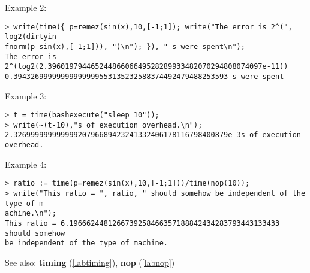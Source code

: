 \noindent Example 2: 
\begin{center}\begin{minipage}{15cm}\begin{Verbatim}[frame=single]
> write(time({ p=remez(sin(x),10,[-1;1]); write("The error is 2^(", log2(dirtyin
fnorm(p-sin(x),[-1;1])), ")\n"); }), " s were spent\n");
The error is 2^(log2(2.39601979446524486606649528289933482070294808074097e-11))
0.39432699999999999999553135232588374492479488253593 s were spent
\end{Verbatim}
\end{minipage}\end{center}
\noindent Example 3: 
\begin{center}\begin{minipage}{15cm}\begin{Verbatim}[frame=single]
> t = time(bashexecute("sleep 10"));
> write(~(t-10),"s of execution overhead.\n");
2.32699999999999920796689423241332406178116798400879e-3s of execution overhead.
\end{Verbatim}
\end{minipage}\end{center}
\noindent Example 4: 
\begin{center}\begin{minipage}{15cm}\begin{Verbatim}[frame=single]
> ratio := time(p=remez(sin(x),10,[-1;1]))/time(nop(10));
> write("This ratio = ", ratio, " should somehow be independent of the type of m
achine.\n");
This ratio = 6.1966624481266739258466357188842434283793443133433 should somehow 
be independent of the type of machine.
\end{Verbatim}
\end{minipage}\end{center}
See also: \textbf{timing} (\ref{labtiming}), \textbf{nop} (\ref{labnop})
